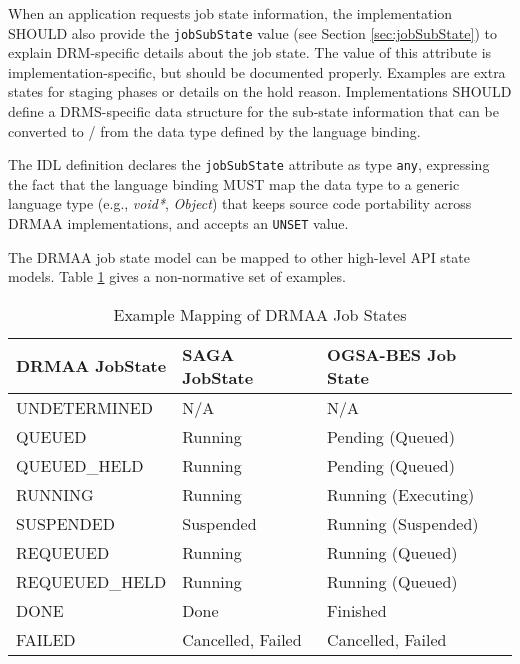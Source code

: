 \documentclass{article}
\newcommand{\h}[1]{\lstinline|#1|}
\newcommand{\langbind}[1]{\begin{shaded}#1\end{shaded}}
\begin{document}
When an application requests job state information, the implementation SHOULD also provide the \h{jobSubState} value (see Section \ref{sec:jobSubState}) to explain DRM-specific details about the job state. The value of this attribute is implementation-specific, but should be documented properly. Examples are extra states for staging phases or details on the hold reason. Implementations SHOULD define a DRMS-specific data structure for the sub-state information that can be converted to / from the data type defined by the language binding.

\langbind{
The IDL definition declares the \h{jobSubState} attribute as type \h{any}, expressing the fact that the language binding MUST map the data type to a generic language type (e.g., \emph{void*}, \emph{Object}) that keeps source code portability across DRMAA implementations, and accepts an \h{UNSET} value. 
}

The DRMAA job state model can be mapped to other high-level API state models. Table \ref{tab:statemappings} gives a non-normative set of examples. 

\begin{table}[ht]
\centering
\begin{tabularx}{\textwidth}{|X|X|X|}
\hline
DRMAA JobState & SAGA JobState \cite{saga} & OGSA-BES Job State \cite{gfd.108}\\
\hline
UNDETERMINED   & N/A                       & N/A \\
QUEUED               & Running                   & Pending (Queued) \\
QUEUED\_HELD   & Running                 & Pending (Queued)  \\
RUNNING            & Running                   & Running (Executing) \\
SUSPENDED         & Suspended                 & Running (Suspended) \\
REQUEUED          & Running                 &  Running (Queued) \\
REQUEUED\_HELD & Running                & Running (Queued) \\
DONE                     & Done                      & Finished \\
FAILED                 & Cancelled, Failed         & Cancelled, Failed \\
\hline
\end{tabularx}
\caption{Example Mapping of DRMAA Job States}
\label{tab:statemappings}
\end{table}
\end{document}
